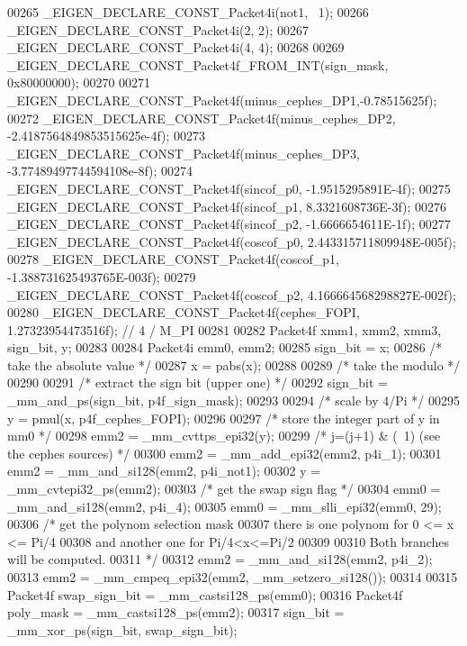 \begin{DoxyCode}
00265   \_EIGEN\_DECLARE\_CONST\_Packet4i(not1, ~1);
00266   \_EIGEN\_DECLARE\_CONST\_Packet4i(2, 2);
00267   \_EIGEN\_DECLARE\_CONST\_Packet4i(4, 4);
00268 
00269   \_EIGEN\_DECLARE\_CONST\_Packet4f\_FROM\_INT(sign\_mask, 0x80000000);
00270 
00271   \_EIGEN\_DECLARE\_CONST\_Packet4f(minus\_cephes\_DP1,-0.78515625f);
00272   \_EIGEN\_DECLARE\_CONST\_Packet4f(minus\_cephes\_DP2, -2.4187564849853515625e-4f);
00273   \_EIGEN\_DECLARE\_CONST\_Packet4f(minus\_cephes\_DP3, -3.77489497744594108e-8f);
00274   \_EIGEN\_DECLARE\_CONST\_Packet4f(sincof\_p0, -1.9515295891E-4f);
00275   \_EIGEN\_DECLARE\_CONST\_Packet4f(sincof\_p1,  8.3321608736E-3f);
00276   \_EIGEN\_DECLARE\_CONST\_Packet4f(sincof\_p2, -1.6666654611E-1f);
00277   \_EIGEN\_DECLARE\_CONST\_Packet4f(coscof\_p0,  2.443315711809948E-005f);
00278   \_EIGEN\_DECLARE\_CONST\_Packet4f(coscof\_p1, -1.388731625493765E-003f);
00279   \_EIGEN\_DECLARE\_CONST\_Packet4f(coscof\_p2,  4.166664568298827E-002f);
00280   \_EIGEN\_DECLARE\_CONST\_Packet4f(cephes\_FOPI, 1.27323954473516f); \textcolor{comment}{// 4 / M\_PI}
00281 
00282   Packet4f xmm1, xmm2, xmm3, sign\_bit, y;
00283 
00284   Packet4i emm0, emm2;
00285   sign\_bit = x;
00286   \textcolor{comment}{/* take the absolute value */}
00287   x = pabs(x);
00288 
00289   \textcolor{comment}{/* take the modulo */}
00290 
00291   \textcolor{comment}{/* extract the sign bit (upper one) */}
00292   sign\_bit = \_mm\_and\_ps(sign\_bit, p4f\_sign\_mask);
00293 
00294   \textcolor{comment}{/* scale by 4/Pi */}
00295   y = pmul(x, p4f\_cephes\_FOPI);
00296 
00297   \textcolor{comment}{/* store the integer part of y in mm0 */}
00298   emm2 = \_mm\_cvttps\_epi32(y);
00299   \textcolor{comment}{/* j=(j+1) & (~1) (see the cephes sources) */}
00300   emm2 = \_mm\_add\_epi32(emm2, p4i\_1);
00301   emm2 = \_mm\_and\_si128(emm2, p4i\_not1);
00302   y = \_mm\_cvtepi32\_ps(emm2);
00303   \textcolor{comment}{/* get the swap sign flag */}
00304   emm0 = \_mm\_and\_si128(emm2, p4i\_4);
00305   emm0 = \_mm\_slli\_epi32(emm0, 29);
00306   \textcolor{comment}{/* get the polynom selection mask}
00307 \textcolor{comment}{     there is one polynom for 0 <= x <= Pi/4}
00308 \textcolor{comment}{     and another one for Pi/4<x<=Pi/2}
00309 \textcolor{comment}{}
00310 \textcolor{comment}{     Both branches will be computed.}
00311 \textcolor{comment}{  */}
00312   emm2 = \_mm\_and\_si128(emm2, p4i\_2);
00313   emm2 = \_mm\_cmpeq\_epi32(emm2, \_mm\_setzero\_si128());
00314 
00315   Packet4f swap\_sign\_bit = \_mm\_castsi128\_ps(emm0);
00316   Packet4f poly\_mask = \_mm\_castsi128\_ps(emm2);
00317   sign\_bit = \_mm\_xor\_ps(sign\_bit, swap\_sign\_bit);

\end{DoxyCode}

